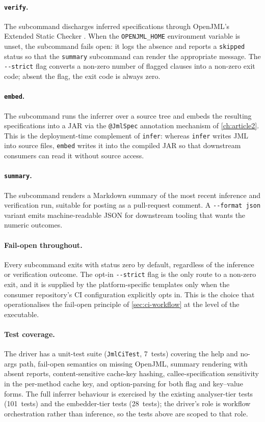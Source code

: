\paragraph{\texttt{verify}.} The subcommand discharges inferred specifications
through OpenJML's Extended Static Checker \citep{cok2014openjml}. When the
\texttt{OPENJML\_HOME} environment variable is unset, the subcommand fails open:
it logs the absence and reports a \texttt{skipped} status so that the
\texttt{summary} subcommand can render the appropriate message. The
\texttt{-{}-strict} flag converts a non-zero number of flagged clauses into a
non-zero exit code; absent the flag, the exit code is always zero.

\paragraph{\texttt{embed}.} The subcommand runs the inferrer over a source tree
and embeds the resulting specifications into a JAR via the \texttt{@JmlSpec}
annotation mechanism of \cref{ch:article2}. This is the deployment-time
complement of \texttt{infer}: whereas \texttt{infer} writes JML into source
files, \texttt{embed} writes it into the compiled JAR so that downstream
consumers can read it without source access.

\paragraph{\texttt{summary}.} The subcommand renders a Markdown summary of the
most recent inference and verification run, suitable for posting as a
pull-request comment. A \texttt{-{}-format json} variant emits machine-readable
JSON for downstream tooling that wants the numeric outcomes.

\paragraph{Fail-open throughout.} Every subcommand exits with status zero by
default, regardless of the inference or verification outcome. The opt-in
\texttt{-{}-strict} flag is the only route to a non-zero exit, and it is supplied
by the platform-specific templates only when the consumer repository's CI
configuration explicitly opts in. This is the choice that operationalises the
fail-open principle of \cref{sec:ci-workflow} at the level of the executable.

\paragraph{Test coverage.} The driver has a unit-test suite (\texttt{JmlCiTest},
7~tests) covering the help and no-args path, fail-open semantics on missing
OpenJML, summary rendering with absent reports, content-sensitive cache-key
hashing, callee-specification sensitivity in the per-method cache key, and
option-parsing for both flag and key--value forms. The full inferrer behaviour is
exercised by the existing analyser-tier tests (101~tests) and the embedder-tier
tests (28~tests); the driver's role is workflow orchestration rather than
inference, so the tests above are scoped to that role.

